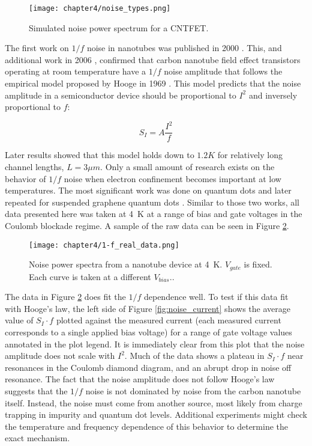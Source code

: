 \begin{figure}
    \centering
    \texttt{[image: chapter4/noise\_types.png]}
    \caption{Simulated noise power spectrum for a CNTFET.}
    \label{fig:simulated_noise}
\end{figure}

The first work on $1/f$ noise in nanotubes was published in 2000 \cite{Collins2000}. This, and additional work in 2006 \cite{Ishigami2006}, confirmed that carbon nanotube field effect transistors operating at room temperature have a $1/f$ noise amplitude that follows the empirical model proposed by Hooge in 1969 \cite{Hooge1969}. This model predicts that the noise amplitude in a semiconductor device should be proportional to $I^2$ and inversely proportional to $f$:

\begin{equation}
    \label{eq:hooge}
    S_{I} = A\frac{I^2}{f}
\end{equation}

Later results \cite{Tobias2008} showed that this model holds down to $1.2K$ for relatively long channel lengths, $L=3\mu m$. Only a small amount of research exists on the behavior of $1/f$ noise when electron confinement becomes important at low temperatures. The most significant work was done on  quantum dots \cite{Jung2004} and later repeated for suspended graphene quantum dots \cite{Song2015}. Similar to those two works, all data presented here was taken at \SI{4}{\kelvin} at a range of bias and gate voltages in the Coulomb blockade regime. A sample of the raw data can be seen in Figure \ref{fig:1-f_data}.

\begin{figure}
    \centering
    \texttt{[image: chapter4/1-f\_real\_data.png]}
    \caption{Noise power spectra from a nanotube device at \SI{4}{\kelvin}. $V_{gate}$ is fixed. Each curve is taken at a different $V_{bias}.$.}
    \label{fig:1-f_data}
\end{figure}

The data in Figure \ref{fig:1-f_data} does fit the $1/f$ dependence well. To test if this data fit with Hooge's law, the left side of Figure \ref{fig:noise_current} shows the average value of $S_I \cdot f$ plotted against the measured current (each measured current corresponds to a single applied bias voltage) for a range of gate voltage values annotated in the plot legend. It is immediately clear from this plot that the noise amplitude does not scale with $I^2$. Much of the data shows a plateau in $S_I \cdot f$ near resonances in the Coulomb diamond diagram, and an abrupt drop in noise off resonance. The fact that the noise amplitude does not follow Hooge's law suggests that the $1/f$ noise is not dominated by noise from the carbon nanotube itself. Instead, the noise must come from another source, most likely from charge trapping in impurity and quantum dot levels. Additional experiments might check the temperature and frequency dependence of this behavior to determine the exact mechanism.

